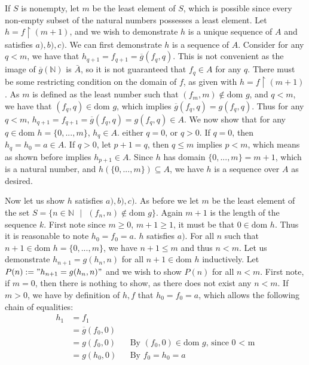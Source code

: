 \documentclass{article}
\begin{document}
\begin{enumerate}
		 \medskip
		 If $S$ is nonempty, let $m$ be the least element of $S$, which is possible since every non-empty subset of the natural numbers possesses a least element. Let $h = f \upharpoonright (m + 1)$, and we wish to demonstrate $h$ is a unique sequence of $A$ and satisfies $a),b),c)$. We can first demonstrate $h$ is a sequence of $A$. Consider for any $q < m$, we have that $h_{q + 1} = f_{q + 1} = \overline{g}(f_q, q)$. This is not convenient as the image of $\overline{g}(\mathbb{N})$ is $\bar{A}$, so it is not guaranteed that $f_{q} \in A$ for any $q$. There must be some restricting condition on the domain of $f$, as given with $h = f \upharpoonright (m + 1)$. As $m$ is defined as the least number such that $(f_m, m) \notin \text{dom }g$, and $q < m$, we have that $(f_q, q) \in \text{dom }g$, which implies $\overline{g}(f_q, q) = g(f_q, q)$. Thus for any $q < m$, $h_{q + 1} = f_{q + 1} = \overline{g}(f_q, q) = g(f_q, q) \in A$. We now show that for any $q \in \text{dom }h = \{0, ..., m\}$, $h_q \in A$. either $q = 0$, or $q > 0$. If $q = 0$, then $h_q = h_0 = a \in A$. If $q > 0$, let $p + 1 = q$, then $q \leq m$ implies $p < m$, which means as shown before implies $h_{p + 1} \in A$. Since $h$ has domain $\{0, ..., m\} = m + 1$, which is a natural number, and $h(\{0, ..., m\}) \subseteq A$, we have $h$ is a sequence over $A$ as desired.
		 
		 Now let us show $h$ satisfies $a),b),c)$. As before we let $m$ be the least element of the set $S = \{n \in \mathbb{N} \text{ } | \text{ } (f_n, n) \notin \text{dom } g\}$. Again $m + 1$ is the length of the sequence $k$. First note since $m \geq 0$, $m + 1 \geq 1$, it must be that $0 \in \text{dom } h$. Thus it is reasonable to note $h_0 = f_0 = a$. $h$ satisfies $a)$. For all $n$ such that $n + 1 \in \text{dom } h = \{0,...,m\}$, we have $n + 1 \leq m$ and thus $n < m$. Let us demonstrate $h_{n + 1} = g(h_n, n)$ for all $n + 1 \in \text{dom } h$ inductively. Let $P(n) := "h_{n + 1} = g(h_n, n)"$ and we wish to show $P(n)$ for all $n < m$. First note, if $m = 0$, then there is nothing to show, as there does not exist any $n < m$. If $m > 0$, we have by definition of $h,f$ that $h_0 = f_0 = a$, which allows the following chain of equalities:
		 \begin{align*}
		 	h_1&= f_1\\
			&= \overline{g}(f_0, 0)\\
			&= g(f_0, 0) && \text{By $(f_0, 0) \in \text{dom } g$, since 0 < m}\\
			&= g(h_0, 0) && \text{By $f_0 = h_0 = a$}\\
		 \end{align*}
	 

\end{enumerate}
\end{document}
